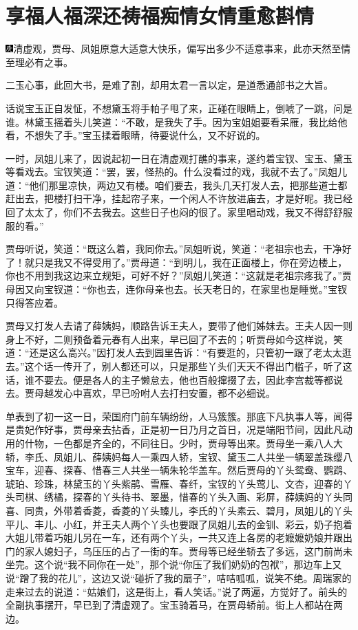 

\chapter{享福人福深还祷福\hspace{.5em}痴情女情重愈斟情}

{\includegraphics[width=3mm]{../Images/00004}清虚观，贾母、凤姐原意大适意大快乐，偏写出多少不适意事来，此亦天然至情至理必有之事。}

{二玉心事，此回大书，是难了割，却用太君一言以定，是道悉通部书之大旨。}

话说宝玉正自发怔，不想黛玉将手帕子甩了来，正碰在眼睛上，倒唬了一跳，问是谁。林黛玉摇着头儿笑道：``不敢，是我失了手。因为宝姐姐要看呆雁，我比给他看，不想失了手。''宝玉揉着眼睛，待要说什么，又不好说的。

一时，凤姐儿来了，因说起初一日在清虚观打醮的事来，遂约着宝钗、宝玉、黛玉等看戏去。宝钗笑道：``罢，罢，怪热的。什么没看过的戏，我就不去了。''凤姐儿道：``他们那里凉快，两边又有楼。咱们要去，我头几天打发人去，把那些道士都赶出去，把楼打扫干净，挂起帘子来，一个闲人不许放进庙去，才是好呢。我已经回了太太了，你们不去我去。这些日子也闷的很了。家里唱动戏，我又不得舒舒服服的看。''

贾母听说，笑道：``既这么着，我同你去。''凤姐听说，笑道：``老祖宗也去，干净好了！就只是我又不得受用了。''贾母道：``到明儿，我在正面楼上，你在旁边楼上，你也不用到我这边来立规矩，可好不好？''凤姐儿笑道：``这就是老祖宗疼我了。''贾母因又向宝钗道：``你也去，连你母亲也去。长天老日的，在家里也是睡觉。''宝钗只得答应着。

贾母又打发人去请了薛姨妈，顺路告诉王夫人，要带了他们姊妹去。王夫人因一则身上不好，二则预备着元春有人出来，早已回了不去的；听贾母如今这样说，笑道：``还是这么高兴。''因打发人去到园里告诉：``有要逛的，只管初一跟了老太太逛去。''这个话一传开了，别人都还可以，只是那些丫头们天天不得出门槛子，听了这话，谁不要去。便是各人的主子懒怠去，他也百般撺掇了去，因此李宫裁等都说去。贾母越发心中喜欢，早已吩咐人去打扫安置，都不必细说。

单表到了初一这一日，荣国府门前车辆纷纷，人马簇簇。那底下凡执事人等，闻得是贵妃作好事，贾母亲去拈香，正是初一日乃月之首日，况是端阳节间，因此凡动用的什物，一色都是齐全的，不同往日。少时，贾母等出来。贾母坐一乘八人大轿，李氏、凤姐儿、薛姨妈每人一乘四人轿，宝钗、黛玉二人共坐一辆翠盖珠缨八宝车，迎春、探春、惜春三人共坐一辆朱轮华盖车。然后贾母的丫头鸳鸯、鹦鹉、琥珀、珍珠，林黛玉的丫头紫鹃、雪雁、春纤，宝钗的丫头莺儿、文杏，迎春的丫头司棋、绣橘，探春的丫头待书、翠墨，惜春的丫头入画、彩屏，薛姨妈的丫头同喜、同贵，外带着香菱，香菱的丫头臻儿，李氏的丫头素云、碧月，凤姐儿的丫头平儿、丰儿、小红，并王夫人两个丫头也要跟了凤姐儿去的金钏、彩云，奶子抱着大姐儿带着巧姐儿另在一车，还有两个丫头，一共又连上各房的老嬷嬷奶娘并跟出门的家人媳妇子，乌压压的占了一街的车。贾母等已经坐轿去了多远，这门前尚未坐完。这个说``我不同你在一处''，那个说``你压了我们奶奶的包袱''，那边车上又说``蹭了我的花儿''，这边又说``碰折了我的扇子''，咭咭呱呱，说笑不绝。周瑞家的走来过去的说道：``姑娘们，这是街上，看人笑话。''说了两遍，方觉好了。前头的全副执事摆开，早已到了清虚观了。宝玉骑着马，在贾母轿前。街上人都站在两边。

